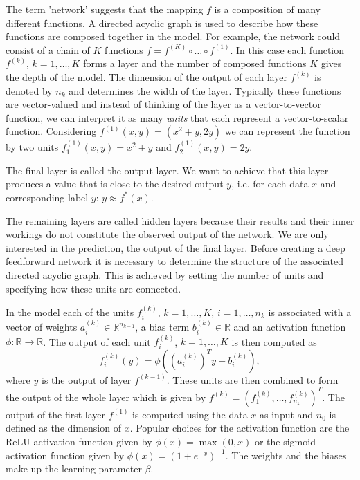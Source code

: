 \documentclass[12pt, a4paper]{scrartcl}
\theoremstyle{definition}
\theoremstyle{plain}
\numberwithin{equation}{section}
\numberwithin{figure}{section}
\numberwithin{table}{section}
\begin{document}
	The term 'network' suggests that the mapping $f$ is a composition of many different functions.
	A directed acyclic graph is used to describe how these functions are composed together in the model.
	For example, the network could consist of a chain of $K$ functions $ f = f^{(K)}\circ \dots \circ f^{(1)}$.
	In this case each function~$f^{(k)}$, $k=1,\dots,K$ forms a layer and the number of composed functions $K$ gives the depth of the model.
	The dimension of the output of each layer $f^{(k)}$ is denoted by $n_k$ and determines the width of the layer.
	Typically these functions are vector-valued and instead of thinking of the layer as a vector-to-vector function, we can interpret it as many \emph{units} that each represent a vector-to-scalar function.
	Considering $f^{(1)}(x,y)= (x^2+y,2y)$ we can represent the function by two units $f^{(1)}_1 (x,y) = x^2+y$ and $f^{(1)}_2(x,y) = 2y$.
	
	The final layer is called the output layer.
	We want to achieve that this layer produces a value that is close to the desired output $y$, i.e. for each data $x$ and corresponding label $y$: $y \approx f^*(x)$.
	
	The remaining layers are called hidden layers because their results and their inner workings do not constitute the observed output of the network.
	We are only interested in the prediction, the output of the final layer.
	Before creating a deep feedforward network it is necessary to determine the structure of the associated directed acyclic graph.
	This is achieved by setting the number of units and specifying how these units are connected.
	
	In the model each of the units $f^{(k)}_i$, $k=1,\dots,K$, $i = 1,\dots,n_{k}$ is associated with a vector of weights $a^{(k)}_i \in \mathbb{R}^{n_{k-1}}$, a bias term $b^{(k)}_i\in \mathbb{R}$ and an activation function $\phi: \mathbb{R} \to \mathbb{R}$.
	The output of each unit $f^{(k)}_i$, $k=1,\dots,K$ is then computed as
	\begin{equation*}
	f_i^{(k)}(y) = \phi \left(\left(a^{(k)}_i\right)^Ty + b^{(k)}_i\right),
	\end{equation*}
	where $y$ is the output of layer $f^{(k-1)}$.
	These units are then combined to form the output of the whole layer which is given by $f^{(k)} = \left(f^{(k)}_1,\dots, f^{(k)}_{n_k}\right)^T$.
	The output of the first layer $f^{(1)}$ is computed using the data $x$ as input and $n_0$ is defined as the dimension of $x$.
	Popular choices for the activation function are the ReLU activation function given by $\phi(x) = \max(0,x)$ or the sigmoid activation function given by $\phi(x) = (1+e^{-x})^{-1}$.
	The weights and the biases make up the learning parameter $\beta$.
	
\end{document}
